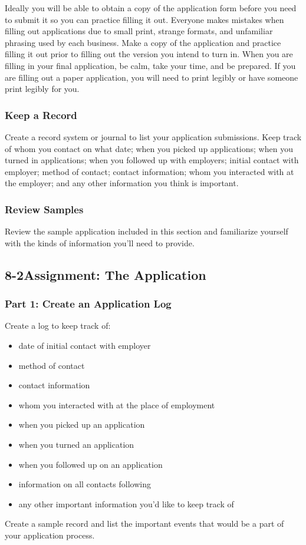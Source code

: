 Ideally you will be able to obtain a copy of the application form before you need to submit it so you can practice filling it out. Everyone makes mistakes when filling out applications due to small print, strange formats, and unfamiliar phrasing used by each business. Make a copy of the application and practice filling it out prior to filling out the version you intend to turn in. When you are filling in your final application, be calm, take your time, and be prepared. If you are filling out a paper application, you will need to print legibly or have someone print legibly for you.

\subsubsection*{Keep a Record}

Create a record system or journal to list your application submissions. Keep track of whom you contact on what date; when you picked up applications; when you turned in applications; when you followed up with employers; initial contact with employer; method of contact; contact information; whom you interacted with at the employer; and any other information you think is important.

\subsubsection*{Review Samples}

Review the sample application included in this section and familiarize yourself with the kinds of information you'll need to provide.
\pagebreak \subsection*{8-2\quad Assignment: The Application}
\subsubsection*{Part 1: Create an Application Log}
Create a log to keep track of:
\begin{itemize}
	\item date of initial contact with employer
	\item method of contact
	\item contact information
	\item whom you interacted with at the place of employment
	\item when you picked up an application
	\item when you turned an application
	\item when you followed up on an application
	\item information on all contacts following
	\item any other important information you'd like to keep track of
\end{itemize}
Create a sample record and list the important events that would be a part of your application process.

